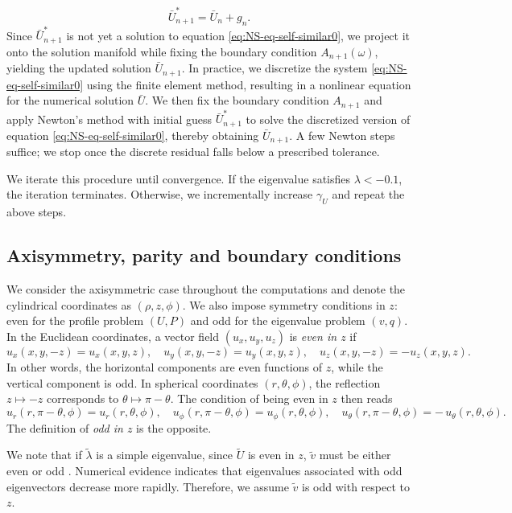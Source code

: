 \documentclass[11pt,a4paper]{article}
\numberwithin{equation}{section}
\begin{document}
\[ \bar{U}^{\ast}_{n + 1} = \bar{U}_n + g_n . \]
Since $\bar{U}^{\ast}_{n + 1}$ is not yet a solution to equation
\eqref{eq:NS-eq-self-similar0}, we project it onto the solution manifold while
fixing the boundary condition $A_{n + 1} (\omega)$, yielding the updated
solution $\bar{U}_{n + 1}$. In practice, we discretize the system
\eqref{eq:NS-eq-self-similar0} using the finite element method, resulting in a
nonlinear equation for the numerical solution $\bar{U}$. We then fix the
boundary condition $A_{n + 1}$ and apply Newton's method with initial guess
$\bar{U}^{\ast}_{n + 1}$ to solve the discretized version of equation
\eqref{eq:NS-eq-self-similar0}, thereby obtaining $\bar{U}_{n + 1}$. A few
Newton steps suffice; we stop once the discrete residual falls below a
prescribed tolerance.

We iterate this procedure until convergence. If the eigenvalue satisfies
$\lambda < - 0.1$, the iteration terminates. Otherwise, we incrementally
increase $\gamma_U$ and repeat the above steps.


\subsection{Axisymmetry, parity and boundary conditions}\label{sec:sym}
We consider the axisymmetric case throughout the computations and denote the cylindrical coordinates as $(\rho,z,\phi)$. We also impose symmetry conditions in $z$: even for the profile problem $(U,P)$ and odd for the eigenvalue problem $(v,q)$. In the Euclidean coordinates, a vector field $(u_x,u_y,u_z)$ is \emph{even in $z$} if 
\[
u_x(x,y,-z)=u_x(x,y,z),\quad  
u_y(x,y,-z)=u_y(x,y,z),\quad  
u_z(x,y,-z)=-u_z(x,y,z).
\]
In other words, the horizontal components are even functions of $z$, while the vertical component is odd. In spherical coordinates $(r,\theta,\phi)$, the reflection $z\mapsto -z$ corresponds to $\theta \mapsto \pi-\theta$. The condition of being even in $z$ then reads  
\[
u_r(r,\pi-\theta,\phi) = u_r(r,\theta,\phi),\quad  
u_\phi(r,\pi-\theta,\phi) = u_\phi(r,\theta,\phi),\quad  
u_\theta(r,\pi-\theta,\phi) = -\,u_\theta(r,\theta,\phi).
\]
The definition of \emph{odd in $z$} is the opposite.

We note that if $\widetilde{\lambda}$ is a simple eigenvalue, since $\widetilde{U}$ is even in $z$, $\widetilde{v}$ must be either even or odd%
.
Numerical evidence indicates that eigenvalues associated with odd
eigenvectors decrease more rapidly. Therefore, we assume $\widetilde{v}$ is odd
with respect to $z$. 
\end{document}
